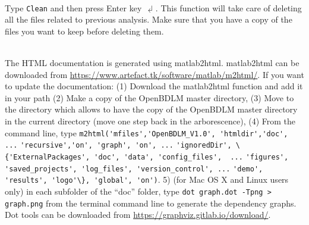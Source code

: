 \begin{description}[style=unboxed]
\item[\textbf{How can I clean my OpenBDLM working directory ?}] \leavevmode \\
Type  \colorbox{light-gray}{\lstinline[basicstyle = \mlttfamily \small, backgroundcolor = \color{light-gray}]!Clean!} and then press Enter key $\dlsh$. This function will take care of deleting all the files related to previous analysis. Make sure that you have a copy of the files you want to keep before deleting them.

\item[\textbf{Where does the HTML documentation come from ?}] \leavevmode \\
The HTML documentation is generated using matlab2html.
matlab2html can be downloaded from \url{https://www.artefact.tk/software/matlab/m2html/}.
If you want to update the documentation: (1) Download the matlab2html function and add it in your \MATLAB{} path (2) Make a copy of the OpenBDLM master directory, (3) Move to the directory which allows to have the copy of the OpenBDLM master directory in the current directory (move one step back in the arborescence), (4) From the \MATLAB{} command line, type \colorbox{light-gray}{\lstinline[basicstyle = \mlttfamily \small, backgroundcolor = \color{light-gray}]!m2html('mfiles','OpenBDLM_V1.0', 'htmldir','doc', ...!}
\colorbox{light-gray}{\lstinline[basicstyle = \mlttfamily \small, backgroundcolor = \color{light-gray}]!'recursive','on', 'graph', 'on', ...!}
\colorbox{light-gray}{\lstinline[basicstyle = \mlttfamily \small, backgroundcolor = \color{light-gray}]!'ignoredDir', \{'ExternalPackages', 'doc', 'data', 'config_files',  ...!}
\colorbox{light-gray}{\lstinline[basicstyle = \mlttfamily \small, backgroundcolor = \color{light-gray}]!'figures', 'saved_projects', 'log_files', 'version_control', ...!}
\colorbox{light-gray}{\lstinline[basicstyle = \mlttfamily \small, backgroundcolor = \color{light-gray}]!'demo', 'results', 'logo'\}, 'global', 'on')!}.
5) (for Mac OS X and Linux users only) in each subfolder of the ``doc'' folder, type \colorbox{light-gray}{\lstinline[basicstyle = \mlttfamily \small, backgroundcolor = \color{light-gray}]!dot graph.dot -Tpng > graph.png!} from the terminal command line to generate the dependency graphs. Dot tools can be downloaded from \url{https://graphviz.gitlab.io/download/}.

\item[\textbf{How to cite OpenBDLM ?}] \leavevmode \\


\end{description}
